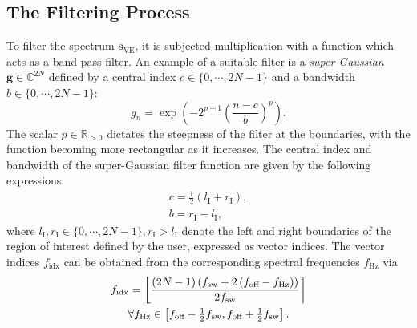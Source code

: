 \subsection{The Filtering Process}
\begin{remark}
    \label{corr:rect-filter}
\end{remark}

To filter the spectrum $\symbf{s}_{\text{VE}}$, it is subjected multiplication
with a function which acts as a band-pass filter. An example of a suitable
filter is a \emph{super-Gaussian} $\symbf{g} \in \mathbb{C}^{2N}$ defined by a
central index  $c \in \lbrace 0, \cdots, 2N-1 \rbrace$ and a bandwidth $b \in
\lbrace 0, \cdots, 2N-1 \rbrace$:
\begin{equation}
    g_n = \exp \left(-2^{p+1} \left(\frac{n - c}{b}\right)^p\right).
    \label{eq:super-Gaussian-onedim}
\end{equation}
The scalar $p \in \mathbb{R}_{>0}$ dictates the steepness
of the filter at the boundaries, with the function becoming more rectangular
as it increases.
The central index and bandwidth of the super-Gaussian filter function are given
by the following expressions:
\begin{subequations}
    \begin{gather}
        c = \tfrac{1}{2} \left(l_{\text{I}} + r_{\text{I}}\right), \\
        b = r_{\text{I}} - l_{\text{I}},
    \end{gather}
\end{subequations}
where $l_{\text{I}}, r_{\text{I}} \in \lbrace 0, \cdots, 2N-1 \rbrace,
r_{\text{I}} > l_{\text{I}}$ denote the left and right
boundaries of the region of interest defined by the user, expressed as vector
indices.
The vector indices $f_{\text{idx}}$ can be obtained from the corresponding
spectral frequencies $f_{\unit{\hertz}}$ via
\begin{equation}
    \begin{gathered}
        f_{\text{idx}} =
            \left \lfloor
                \frac
                {
                    \left(2N - 1\right)
                    \left(\fsw + 2 \left(\foff - f_{\unit{\hertz}}\right) \right)
                }
                {2 \fsw}
            \right \rceil \\
        \forall f_{\unit{\hertz}} \in
            \left[\foff - \tfrac{1}{2} \fsw, \foff + \tfrac{1}{2} \fsw\right].
        \label{eq:fidx}
    \end{gathered}
\end{equation}
